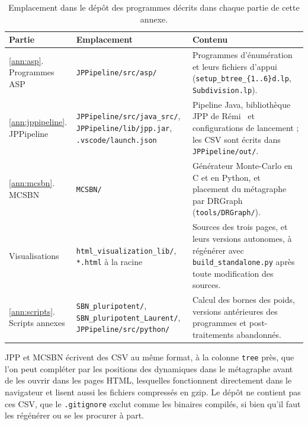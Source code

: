 \begin{table}[htbp]
\centering
\footnotesize
\setlength{\tabcolsep}{4pt}
\renewcommand{\arraystretch}{1.2}
\begin{tabular}{@{}>{\raggedright\arraybackslash}p{2.9cm} >{\raggedright\arraybackslash}p{5.3cm} >{\raggedright\arraybackslash}p{7.1cm}@{}}
\toprule
Partie & Emplacement & Contenu \\
\midrule
\ref{ann:asp}. Programmes ASP & \texttt{JPPipeline/src/asp/} & Programmes d'énumération et leurs fichiers d'appui (\texttt{setup\_btree\_\{1..6\}d.lp}, \texttt{Subdivision.lp}). \\
\ref{ann:jppipeline}. JPPipeline & \texttt{JPPipeline/src/java\_src/}, \texttt{JPPipeline/lib/jpp.jar}, \texttt{.vscode/launch.json} & Pipeline Java, bibliothèque JPP de Rémi~\cite{segretain2023} et configurations de lancement ; les CSV sont écrits dans \texttt{JPPipeline/out/}. \\
\ref{ann:mcsbn}. MCSBN & \texttt{MCSBN/} & Générateur Monte-Carlo en C et en Python, et placement du métagraphe par DRGraph (\texttt{tools/DRGraph/}). \\
Visualisations & \texttt{html\_visualization\_lib/}, \texttt{*.html} à la racine & Sources des trois pages, et leurs versions autonomes, à régénérer avec \texttt{build\_standalone.py} après toute modification des sources. \\
\ref{ann:scripts}. Scripts annexes & \texttt{SBN\_pluripotent/}, \texttt{SBN\_pluripotent\_\allowbreak Laurent/}, \texttt{JPPipeline/src/python/} & Calcul des bornes des poids, versions antérieures des programmes et post-traitements abandonnés. \\
\bottomrule
\end{tabular}
\caption{Emplacement dans le dépôt des programmes décrits dans chaque partie de cette annexe.}
\label{tab:a-carte}
\end{table}

JPP et MCSBN écrivent des CSV au même format, à la colonne \texttt{tree} près, que l'on peut compléter par les positions des dynamiques dans le métagraphe avant de les ouvrir dans les pages HTML, lesquelles fonctionnent directement dans le navigateur et lisent aussi les fichiers compressés en gzip.
Le dépôt ne contient pas ces CSV, que le \texttt{.gitignore} exclut comme les binaires compilés, si bien qu'il faut les régénérer ou se les procurer à part.

